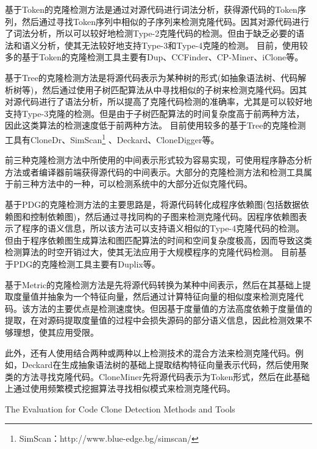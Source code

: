 基于Token的克隆检测方法是通过对源代码进行词法分析，获得源代码的Token序列，然后通过寻找Token序列中相似的子序列来检测克隆代码。因其对源代码进行了词法分析，所以可以较好地检测Type-2克隆代码的检测。但由于缺乏必要的语法和语义分析，使其无法较好地支持Type-3和Type-4克隆的检测。
目前，使用较多的基于Token的克隆检测工具主要有Dup\cite{baker1995finding}、CCFinder\cite{kamiya2002ccfinder}、CP-Miner\cite{li2006cp}、iClone\cite{gode2009incremental}等。

基于Tree的克隆检测方法是将源代码表示为某种树的形式(如抽象语法树、代码解析树等)，然后通过使用子树匹配算法从中寻找相似的子树来检测克隆代码。因其对源代码进行了语法分析，所以提高了克隆代码检测的准确率，尤其是可以较好地支持Type-3克隆的检测。但是由于子树匹配算法的时间复杂度高于前两种方法，因此这类算法的检测速度低于前两种方法。
目前使用较多的基于Tree的克隆检测工具有CloneDr\cite{baxter1998clone}、SimScan\footnote{SimScan：http://www.blue-edge.bg/simscan/}%
、Deckard\cite{jiang2007deckard}、CloneDigger\cite{bulychev2008duplicate}等。

前三种克隆检测方法中所使用的中间表示形式较为容易实现，可使用程序静态分析方法或者编译器前端获得源代码的中间表示。大部分的克隆检测方法和检测工具属于前三种方法中的一种，可以检测系统中的大部分近似克隆代码。

基于PDG的克隆检测方法的主要思路是，将源代码转化成程序依赖图(包括数据依赖图和控制依赖图)，然后通过寻找同构的子图来检测克隆代码。因程序依赖图表示了程序的语义信息，所以该方法可以支持语义相似的Type-4克隆代码的检测。但由于程序依赖图生成算法和图匹配算法的时间和空间复杂度极高，因而导致这类检测算法的时空开销过大，使其无法应用于大规模程序的克隆代码检测。
目前基于PDG的克隆检测工具主要有Duplix\cite{krinke2001identifying}等。

基于Metric的克隆检测方法是先将源代码转换为某种中间表示，然后在其基础上提取度量值并抽象为一个特征向量，然后通过计算特征向量的相似度来检测克隆代码。该方法的主要优点是检测速度快。但因基于度量值的方法高度依赖于度量值的提取，在对源码提取度量值的过程中会损失源码的部分语义信息，因此检测效果不够理想，使其应用受限。

此外，还有人使用结合两种或两种以上检测技术的混合方法来检测克隆代码。例如，Deckard在生成抽象语法树的基础上提取结构特征向量表示代码，然后使用聚类的方法寻找克隆代码\cite{jiang2007deckard}。CloneMiner先将源代码表示为Token形式，然后在此基础上通过使用频繁模式挖掘算法寻找相似模式来检测克隆代码\cite{basit2009data}。


{The Evaluation for Code Clone Detection Methods and Tools}

